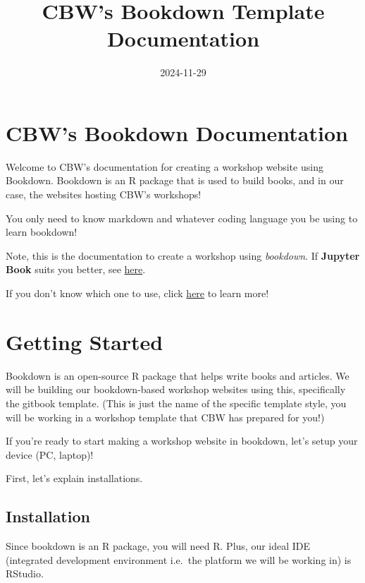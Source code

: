 \documentclass[
]{book}
\title{CBW's Bookdown Template Documentation}
\author{}
\date{\vspace{-2.5em}2024-11-29}
\theoremstyle{definition}
\theoremstyle{definition}
\theoremstyle{definition}
\theoremstyle{definition}
\theoremstyle{remark}
\begin{document}
\maketitle

{
\setcounter{tocdepth}{1}
\tableofcontents
}
\chapter{CBW's Bookdown Documentation}\label{cbws-bookdown-documentation}

Welcome to CBW's documentation for creating a workshop website using Bookdown. Bookdown is an R package that is used to build books, and in our case, the websites hosting CBW's workshops!

You only need to know markdown and whatever coding language you be using to learn bookdown!

Note, this is the documentation to create a workshop using \emph{bookdown}. If \textbf{Jupyter Book} suits you better, see \href{https://cbw-dev.github.io/jupyterbook-docs/}{here}.

If you don't know which one to use, click \href{}{here} to learn more!

\chapter{Getting Started}\label{getting-started}

Bookdown is an open-source R package that helps write books and articles. We will be building our bookdown-based workshop websites using this, specifically the gitbook template. (This is just the name of the specific template style, you will be working in a workshop template that CBW has prepared for you!)

If you're ready to start making a workshop website in bookdown, let's setup your device (PC, laptop)!

First, let's explain installations.

\section{Installation}\label{installation}

Since bookdown is an R package, you will need R. Plus, our ideal IDE (integrated development environment i.e.~the platform we will be working in) is RStudio.
\end{document}
